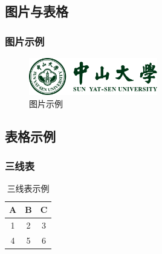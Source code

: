 \documentclass[12pt]{ctexart}
\begin{document}
\begin{sloppypar}
\subsection{图片与表格}
\subsubsection{图片示例}
\begin{figure}[h!]
    \centering
    \includegraphics[width=0.5\textwidth]{figure/badge-horizonal.pdf}
    \caption{图片示例}  %
    \label{fig:example} %
\end{figure}

\subsection{表格示例}

\subsubsection{三线表}
\begin{table}[H]
    \centering
    \caption{三线表示例}
    \label{tab:example}
    \begin{tabular}{ccc}   %
        \toprule        %
        \textbf{A} & \textbf{B} & \textbf{C} \\
        \midrule        %
        1 & 2 & 3 \\
        4 & 5 & 6 \\
        \bottomrule     %
    \end{tabular}
\end{table}


\end{sloppypar}
\end{document}
